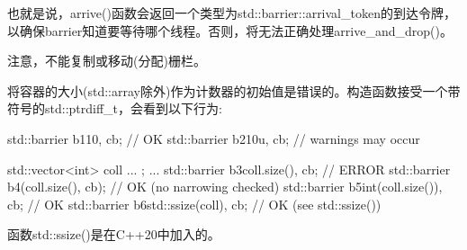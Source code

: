也就是说，arrive()函数会返回一个类型为std::barrier::arrival\_token的到达令牌，以确保barrier知道要等待哪个线程。否则，将无法正确处理arrive\_and\_drop()。

注意，不能复制或移动(分配)栅栏。

将容器的大小(std::array除外)作为计数器的初始值是错误的。构造函数接受一个带符号的std::ptrdiff\_t，会看到以下行为:

\begin{cpp}
std::barrier b1{10, cb}; // OK
std::barrier b2{10u, cb}; // warnings may occur

std::vector<int> coll{ ... };
...
std::barrier b3{coll.size(), cb}; // ERROR
std::barrier b4(coll.size(), cb); // OK (no narrowing checked)
std::barrier b5{int(coll.size()), cb}; // OK
std::barrier b6{std::ssize(coll), cb}; // OK (see std::ssize())
\end{cpp}

函数std::ssize()是在C++20中加入的。




